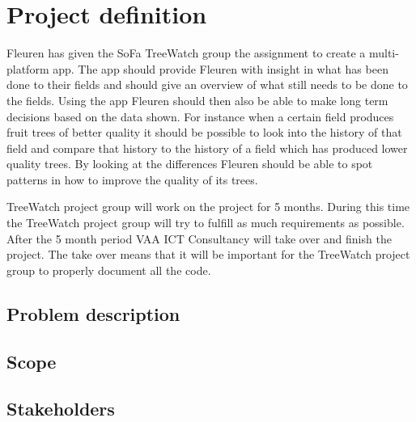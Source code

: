 \section {Project definition}
Fleuren has given the SoFa TreeWatch group the assignment to create a multi-platform app. The app should provide Fleuren with insight in what has been done to their fields and should give an overview of what still needs to be done to the fields. Using the app Fleuren should then also be able to make long term decisions based on the data shown. For instance when a certain field produces fruit trees of better quality it should be possible to look into the history of that field and compare that history to the history of a field which has produced lower quality trees. By looking at the differences Fleuren should be able to spot patterns in how to improve the quality of its trees.

TreeWatch project group will work on the project for 5 months. During this time the TreeWatch project group will try to fulfill as much requirements as possible. After the 5 month period VAA ICT Consultancy will take over and finish the project. The take over means that it will be important for the TreeWatch project group to properly document all the code.

\subsection{Problem description}

\subsection{Scope}

\subsection{Stakeholders}
